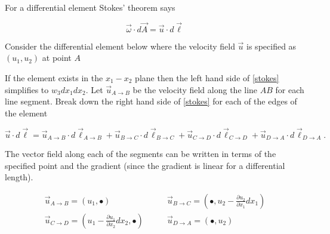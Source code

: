 \documentclass[11pt,twoside]{article}
\newcommand{\p}[2]{\frac{\partial#1}{\partial#2}}
\newcommand{\vect}[1]{\vec{#1}}
\begin{document}
\begin{enumerate}
\begin{enumerate}
For a differential element Stokes' theorem says

\begin{equation}
\vect{\omega}\cdot d\vect{A}=\vect{u}\cdot d\vect{\ell}\label{stokes}
\end{equation}

Consider the differential element below where the velocity field $\vect{u}$ is specified as $(u_1,u_2)$ at point $A$

\begin{center}

\end{center}

If the element exists in the $x_1-x_2$ plane then the left hand side of \autoref{stokes} simplifies to $w_3dx_1dx_2$. Let $\vect{u}_{A\rightarrow B}$ be the velocity field along the line $AB$ for each line segment. Break down the right hand side of \autoref{stokes} for each of the edges of the element

\begin{equation}
\vect{u}\cdot d\vect{\ell} = 
\vect{u}_{A\rightarrow B}\cdot d\vect{\ell}_{A\rightarrow B} + 
\vect{u}_{B\rightarrow C}\cdot d\vect{\ell}_{B\rightarrow C} +
\vect{u}_{C\rightarrow D}\cdot d\vect{\ell}_{C\rightarrow D} +
\vect{u}_{D\rightarrow A}\cdot d\vect{\ell}_{D\rightarrow A}.
\label{line}
\end{equation}

The vector field along each of the segments can be written in terms of the specified point and the gradient (since the gradient is linear for a differential length).

\begin{align*}
\vect{u}_{A\rightarrow B} = (u_1, \bullet)\quad&\quad\vect{u}_{B\rightarrow C} = (\bullet, u_2-\p{u_2}{x_1}dx_1)\\
\vect{u}_{C\rightarrow D} = (u_1-\p{u_1}{x_2}dx_2, \bullet) \quad&\quad\vect{u}_{D\rightarrow A} = (\bullet,u_2)
\end{align*}


\end{enumerate}
\end{enumerate}
\end{document}

